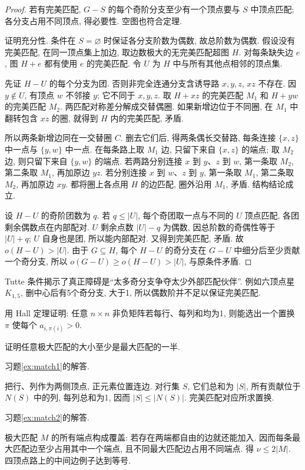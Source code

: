 \begin{proof}
若有完美匹配, $G-S$ 的每个奇阶分支至少有一个顶点要与 $S$ 中顶点匹配; 各分支占用不同顶点, 得必要性. 空图也符合定理.

证明充分性. 条件在 $S=\varnothing$ 时保证各分支阶数为偶数, 故总阶数为偶数. 假设没有完美匹配, 在同一顶点集上加边, 取边数极大的无完美匹配超图 $H$. 对每条缺失边 $e$, 图 $H+e$ 都有使用 $e$ 的完美匹配. 令 $U$ 为 $H$ 中与所有其他点相邻的顶点集.

先证 $H-U$ 的每个分支为团. 否则非完全连通分支含诱导路 $x,y,z$, $xz$ 不存在. 因 $y\notin U$, 有顶点 $w$ 不邻接 $y$; 它不同于 $x,y,z$. 取 $H+xz$ 的完美匹配 $M_1$ 和 $H+yw$ 的完美匹配 $M_2$. 两匹配对称差分解成交替偶圈. 如果新增边位于不同圈, 在 $M_1$ 中翻转包含 $xz$ 的圈, 就得到 $H$ 内的完美匹配, 矛盾.

所以两条新增边同在一交替圈 $C$. 删去它们后, 得两条偶长交替路, 每条连接 $\{x,z\}$ 中一点与 $\{y,w\}$ 中一点. 在每条路上取 $M_1$ 边, 只留下来自 $\{x,z\}$ 的端点; 取 $M_2$ 边, 则只留下来自 $\{y,w\}$ 的端点. 若两路分别连接 $x$ 到 $y$、$z$ 到 $w$, 第一条取 $M_2$, 第二条取 $M_1$, 再加原边 $yz$. 若分别连接 $x$ 到 $w$、$z$ 到 $y$, 第一条取 $M_1$, 第二条取 $M_2$, 再加原边 $xy$. 都将圈上各点用 $H$ 的边匹配, 圈外沿用 $M_1$, 矛盾. 结构结论成立.

设 $H-U$ 的奇阶团数为 $q$. 若 $q\le|U|$, 每个奇团取一点与不同的 $U$ 顶点匹配, 各团剩余偶数点在内部配对. $U$ 剩余点数 $|U|-q$ 为偶数, 因总阶数的奇偶性等于 $|U|+q$; $U$ 自身也是团, 所以能内部配对. 又得到完美匹配, 矛盾. 故 $o(H-U)>|U|$. 由于 $G\subseteq H$, 每个 $H-U$ 的奇分支在 $G-U$ 中细分后至少贡献一个奇分支, 所以 $o(G-U)\ge o(H-U)>|U|$, 与原条件矛盾.
\end{proof}
Tutte 条件揭示了真正障碍是“太多奇分支争夺太少外部匹配伙伴”. 例如六顶点星 $K_{1,5}$, 删中心后有5个奇分支, 大于1, 所以偶数阶并不足以保证完美匹配.
\begin{exercise}\label{ex:match1}
用 Hall 定理证明: 任意 $n\times n$ 非负矩阵若每行、每列和均为1, 则能选出一个置换 $\pi$ 使每个 $a_{i,\pi(i)}>0$.
\end{exercise}
\begin{exercise}\label{ex:match2}
证明任意极大匹配的大小至少是最大匹配的一半.
\end{exercise}
习题\ref{ex:match1}的解答.
\begin{solution}
把行、列作为两侧顶点, 正元素位置连边. 对行集 $S$, 它们总和为 $|S|$, 所有贡献位于 $N(S)$ 中的列, 每列总和为1, 因而 $|S|\le|N(S)|$. 完美匹配对应所求置换.
\end{solution}
习题\ref{ex:match2}的解答.
\begin{solution}
极大匹配 $M$ 的所有端点构成覆盖: 若存在两端都自由的边就还能加入. 因而每条最大匹配边至少占用其中一个端点, 且不同最大匹配边占用不同端点. 得 $\nu\le2|M|$. 四顶点路上的中间边例子达到等号.
\end{solution}
